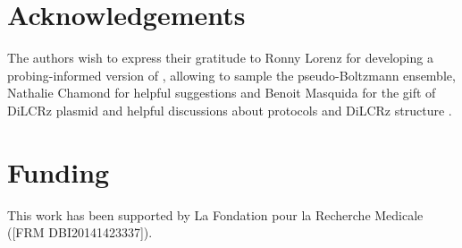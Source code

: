 \documentclass[a4,center,fleqn]{NAR}
\begin{document}
\section*{Acknowledgements}
The authors wish to express their gratitude to Ronny Lorenz for developing a probing-informed version of , allowing to sample the pseudo-Boltzmann ensemble, Nathalie Chamond for helpful suggestions and Benoit Masquida for the gift of DiLCRz plasmid and helpful discussions about protocols and DiLCRz structure .

\section*{Funding}
This work has been supported by La Fondation pour la Recherche Medicale ([FRM
DBI20141423337]).
%


\end{document}
